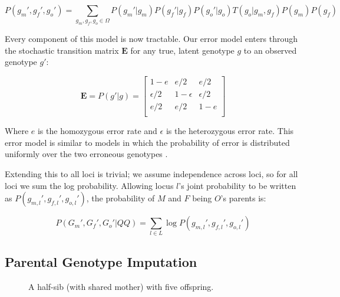 \documentclass[11pt]{article}
\begin{document}
$$
P(g_m', g_f', g_o') = \sum_{g_m,g_f,g_o \in \Omega} P(g_m' | g_m) P(g_f'|g_f) P(g_o'|g_o) T(g_o | g_m, g_f) P(g_m) P(g_f)
$$

%
%
Every component of this model is now tractable. Our error model enters through
the stochastic transition matrix $\bm{E}$ for any true, latent genotype $g$
to an observed genotype $g'$:

$$
\bm{E} = P(g'|g) = \left[ \begin{array}{ccc}
1 - e & e/2 & e/2 \\
\epsilon/2 & 1 - \epsilon & \epsilon/2 \\
e/2 & e/2 & 1 - e \\
\end{array} \right]
$$

Where $e$ is the homozygous error rate and $\epsilon$ is the heterozygous error
rate. This error model is similar to models in which the probability of error
is distributed uniformly over the two erroneous genotypes
\citep*{sobel2002detection,lincoln1992systematic}.

Extending this to all loci is trivial; we assume independence across loci, so
for all loci we sum the log probability. Allowing locus $l$'s joint probability
to be written as $P(g_{m,l}', g_{f,l}', g_{o,l}')$, the probability of $M$ and
$F$ being $O$'s parents is:

$$
P(G_m', G_f', G_o' | QQ) = \sum_{l \in L} \log P(g_{m,l}', g_{f,l}', g_{o,l}')
$$

%

%
%
\subsection{Parental Genotype Imputation}

\begin{figure}
\centering
\begingroup
{}%

\endgroup

\caption{A half-sib (with shared mother) with five offspring.}

\label{fig:dag}

\end{figure}
\end{document}
